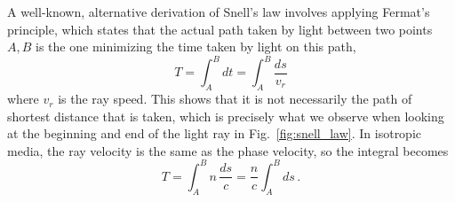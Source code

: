 \documentclass[../class_mech_main.tex]{subfiles}
\begin{document}
\begin{ex}
    A well-known, alternative derivation of Snell's law involves applying Fermat's principle, which states that the actual path taken by light between two points $A, B$ is the one minimizing the time taken by light on this path,
    \begin{equation}
        T = \int_A^B dt = \int_A^B \frac{ds}{v_r}
    \end{equation}
    where $v_r$ is the ray speed. This shows that it is not necessarily the path of shortest distance that is taken, which is precisely what we observe when looking at the beginning and end of the light ray in Fig.~\ref{fig:snell_law}. In isotropic media, the ray velocity is the same as the phase velocity, so the integral becomes
    \begin{equation}
        T = \int_A^B n \, \frac{ds}{c} = \frac{n}{c} \int_A^B ds \, .
    \end{equation}


\end{ex}
\end{document}
